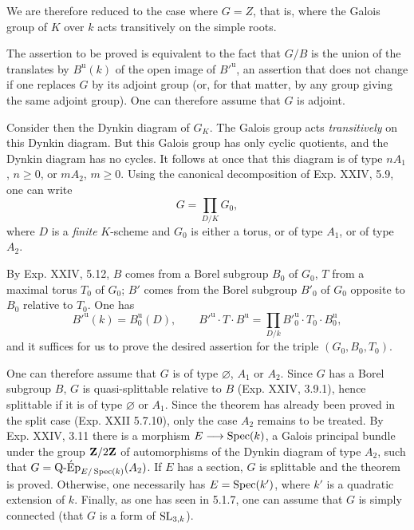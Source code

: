 We are therefore reduced to the case where $G=Z$, that is, where the Galois group of $K$ over $k$ acts transitively on the simple roots.

\label{XXVI.5.1.7}
The assertion to be proved is equivalent to the fact that $G/B$ is the union of the translates by $B^{\mathrm u}(k)$ of the open image of $B'^{\mathrm u}$, an assertion that does not change if one replaces $G$ by its adjoint group (or, for that matter, by any group giving the same adjoint group). One can therefore assume that $G$ is adjoint.

\label{XXVI.5.1.8}
Consider then the Dynkin diagram of $G_K$. The Galois group acts \emph{transitively} on this Dynkin diagram. But this Galois group has only cyclic quotients, and the Dynkin diagram has no cycles. It follows at once that this diagram is of type $nA_1$, $n\geq0$, or $mA_2$, $m\geq0$. Using the canonical decomposition of Exp. XXIV, 5.9, one can write
\[
 G=\prod_{D/K}G_0,
\]
where $D$ is a \emph{finite} $K$-scheme and $G_0$ is either a torus, or of type $A_1$, or of type $A_2$.

By Exp. XXIV, 5.12, $B$ comes from a Borel subgroup $B_0$ of $G_0$, $T$ from a maximal torus $T_0$ of $G_0$; $B'$ comes from the Borel subgroup $B'_0$ of $G_0$ opposite to $B_0$ relative to $T_0$. One has
\[
 B'^{\mathrm u}(k)=B^{\mathrm u}_0(D),\qquad
 B'^{\mathrm u}\cdot T\cdot B^{\mathrm u}
 =\prod_{D/k}B'^{\mathrm u}_0\cdot T_0\cdot B^{\mathrm u}_0,
\]
and it suffices for us to prove the desired assertion for the triple $(G_0,B_0,T_0)$.

\label{XXVI.5.1.9}
One can therefore assume that $G$ is of type $\varnothing$, $A_1$ or $A_2$. Since $G$ has a Borel subgroup $B$, $G$ is quasi-splittable relative to $B$ (Exp. XXIV, 3.9.1), hence splittable if it is of type $\varnothing$ or $A_1$. Since the theorem has already been proved in the split case (Exp. XXII 5.7.10), only the case $A_2$ remains to be treated. By Exp. XXIV, 3.11 there is a morphism $E\longrightarrow\operatorname{Spec}(k)$, a Galois principal bundle under the group $\mathbf{Z}/2\mathbf{Z}$ of automorphisms of the Dynkin diagram of type $A_2$, such that $G=\operatorname{Q\text{-}\acute Ep}_{E/\operatorname{Spec}(k)}(A_2)$. If $E$ has a section, $G$ is splittable and the theorem is proved. Otherwise, one necessarily has $E=\operatorname{Spec}(k')$, where $k'$ is a quadratic extension of $k$. Finally, as one has seen in 5.1.7, one can assume that $G$ is simply connected (\ie that $G$ is a form of $\operatorname{SL}_{3,k}$).

